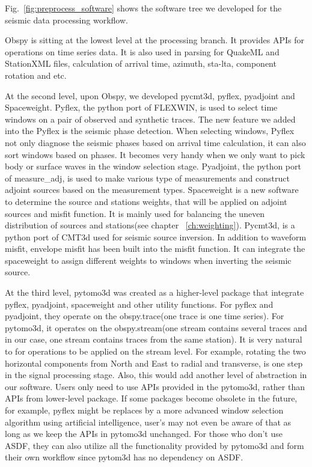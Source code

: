 Fig.~\ref{fig:preprocess_software} shows the software tree we developed
for the seismic data processing workflow.

Obspy is sitting at the lowest level at the processing branch. It provides
APIs for operations on time series data. It is also used in
parsing for QuakeML and StationXML files, calculation of arrival time, azimuth,
sta-lta, component rotation and etc.

At the second level, upon Obspy, we developed pycmt3d, pyflex, pyadjoint and Spaceweight.
Pyflex, the python port of FLEXWIN, is used to select time windows on a pair of observed
and synthetic traces. The new feature we added into the Pyflex is the seismic
phase detection. When selecting windows, Pyflex not only diagnose the seismic phases
based on arrival time calculation, it can also sort windows based on phases.
It becomes very handy when we only want to pick body or surface waves in the window
selection stage. Pyadjoint, the python port of measure\_adj, is used to make
various type of measurements and construct adjoint sources based on the measurement
types. Spaceweight is a new software to determine the source and stations weights,
that will be applied on adjoint sources and misfit function. It is mainly used for
balancing the uneven distribution of sources and stations(see chapter ~\ref{ch:weighting}).
Pycmt3d, is a python port of CMT3d used for seismic source inversion. In addition
to waveform misfit, envelope misfit has been built into the misfit function. It
can integrate the spaceweight to assign different weights to windows when inverting
the seismic source.

At the third level, pytomo3d was created as a higher-level package that integrate
pyflex, pyadjoint, spaceweight and other utility functions.
For pyflex and pyadjoint, they operate on the 
obspy.trace(one trace is one time series). For pytomo3d, it operates on the
obspy.stream(one stream contains several traces and in our case, one stream
contains traces from the same station). It is very natural to for operations to be
applied on the stream level. For example, rotating the two horizontal components 
from North and East to radial and transverse, is one step in the signal processing
stage. Also, this would add another level of abstraction in our software.
Users only need to use APIs provided in the pytomo3d,
rather than APIs from lower-level package.
If some packages become obsolete in the future, for example, pyflex might be
replaces by a more advanced window selection algorithm using artificial intelligence,
user's may not even be aware of that as long as we keep the APIs in pytomo3d unchanged. 
For those who don't use ASDF, they can also utilize all the functionality provided by
pytomo3d and form their own workflow since pytom3d has no dependency on ASDF.


